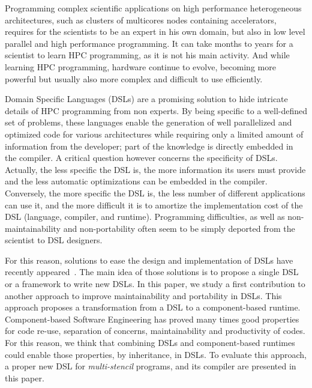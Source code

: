 Programming complex scientific applications on high performance heterogeneous architectures, such as clusters of multicores nodes containing accelerators, requires for the scientists to be an expert in his own domain, but also in low level parallel and high performance programming. It can take months to years for a scientist to learn HPC programming, as it is not his main activity. And while learning HPC programming, hardware continue to evolve, becoming more powerful but usually also more complex and difficult to use efficiently.

Domain Specific Languages (DSLs) are a promising solution to hide intricate details of HPC programming from non experts.
By being specific to a well-defined set of problems, these languages enable the generation of well parallelized and optimized code for various architectures while requiring only a limited amount of information from the developer; part of the knowledge is directly embedded in the compiler.
A critical question however concerns the specificity of DSLs.
Actually, the less specific the DSL is, the more information its users must provide and the less automatic optimizations can be embedded in the compiler.
Conversely, the more specific the DSL is, the less number of different applications can use it, and the more difficult it is to amortize the implementation cost of the DSL (language, compiler, and runtime).
Programming difficulties, as well as non-maintainability and non-portability often seem to be simply deported from the scientist to DSL designers.

For this reason, solutions to ease the design and implementation of DSLs have recently appeared~\cite{Fernandez:2014:DFL:2691166.2691168}. The main idea of those solutions is to propose a single DSL or a framework to write new DSLs. In this paper, we study a first contribution to another approach to improve maintainability and portability in DSLs. This approach proposes a transformation from a DSL to a component-based runtime. Component-based Software Engineering has proved many times good properties for code re-use, separation of concerns, maintainability and productivity of codes. For this reason, we think that combining DSLs and component-based runtimes could enable those properties, by inheritance, in DSLs.
To evaluate this approach, a proper new DSL for \emph{multi-stencil} programs, and its compiler are presented in this paper.

